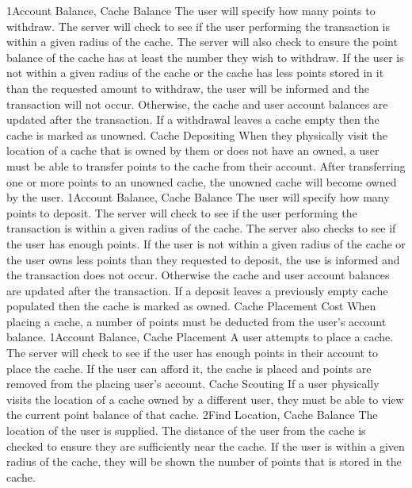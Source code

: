 			{1}{Account Balance, Cache Balance}
			{The user will specify how many points to withdraw.}
			{The server will check to see if the user performing the 
			transaction is within a given radius of the cache. The server will
			also check to ensure the point balance of the cache has at least
			the number they wish to withdraw.}
			{If the user is not within a given radius of the cache or the cache
			has less points stored in it than the requested amount to withdraw,
			the user will be informed and the transaction will not occur. 
			Otherwise, the cache and user account balances are
			updated after the transaction. If a withdrawal leaves a cache empty
			then the cache is marked as unowned.}
		\funcreq %
			{Cache Depositing}
			{When they physically visit the location of a cache that is owned
			by them or does not have an owned, a user must be able to transfer 
			points to the cache from their account. After transferring one or 
			more points to an unowned cache, the unowned cache will become
			owned by the user.}
		    {1}{Account Balance, Cache Balance}
			{The user will specify how many points to deposit.}
			{The server will check to see if the user performing the 
			transaction is within a given radius of the cache. The server also
			checks to see if the user has enough points.}
			{If the user is not within a given radius of the cache or the user
			owns less points than they requested to deposit, the
			use is informed and the transaction does not occur. Otherwise the
			cache and user account balances are updated after the transaction.
			If a deposit leaves a previously empty cache populated then the
			cache is marked as owned.}
		\funcreq %
			{Cache Placement Cost}
			{When placing a cache, a number of points must be deducted from the
			user's account balance.}
			{1}{Account Balance, Cache Placement}
			{A user attempts to place a cache.}
			{The server will check to see if the user has enough points in
			their account to place the cache.}
			{If the user can afford it, the cache is placed and points are 
			removed from the placing user's account.}
		\funcreq %
			{Cache Scouting}
			{If a user physically visits the location of a cache owned by a 
			different user, they must be able to view the current point balance 
            of that cache.}
			{2}{Find Location, Cache Balance}
			{The location of the user is supplied.}
			{The distance of the user from the cache is checked to ensure they 
			are sufficiently near the cache.}
			{If the user is within a given radius of the cache, they will be 
			shown the number of points that is stored in the cache.}
